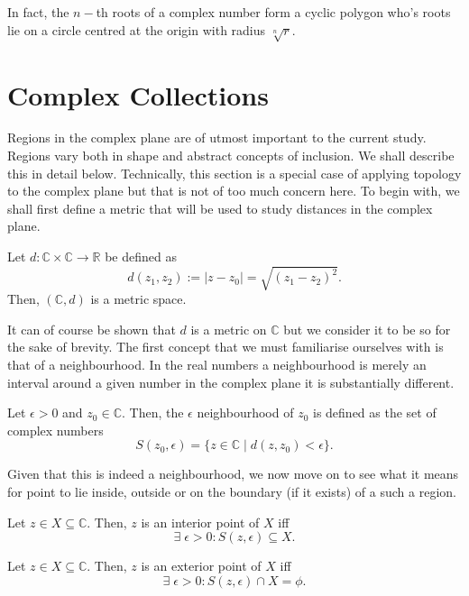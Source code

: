 \documentclass[12pt]{book}
\begin{document}
In fact, the $n-$th roots of a complex number form a cyclic polygon who's roots lie on a circle centred at the origin with radius $\sqrt[n]{r}.$

\section{Complex Collections}
Regions in the complex plane are of utmost important to the current study. Regions vary both in shape and abstract concepts of inclusion. We shall describe this in detail below. Technically, this section is a special case of applying topology to the complex plane but that is not of too much concern here. To begin with, we shall first define a metric that will be used to study distances in the complex plane.

\begin{defn}
    Let $d: \mathbb{C} \times \mathbb{C} \rightarrow \mathbb{R}$ be defined as
    \[
        d(z_1, z_2) := |z - z_{0}| = \sqrt{(z_1 - z_2)^2}.
    \]
    Then, $(\mathbb{C}, d)$ is a metric space.
\end{defn}
It can of course be shown that $d$ is a metric on $\mathbb{C}$ but we consider it to be so for the sake of brevity. The first concept that we must familiarise ourselves with is that of a neighbourhood. In the real numbers a neighbourhood is merely an interval around a given number in the complex plane it is substantially different. 

\begin{defn}
    Let $\epsilon > 0$ and $z_{0} \in \mathbb{C}.$ Then, the $\epsilon$ neighbourhood of $z_{0}$ is defined as the set of complex numbers 
    \[
        S(z_0, \epsilon) = \{z \in \mathbb{C}\; |\; d(z, z_0) < \epsilon\}.
    \]
\end{defn}

Given that this is indeed a neighbourhood, we now move on to see what it means for point to lie inside, outside or on the boundary (if it exists) of a such a region.

\begin{defn}
    Let $z \in X \subseteq \mathbb{C}.$ Then, $z$ is an interior point of $X$ iff
    \[
        \exists\; \epsilon > 0: S(z, \epsilon) \subseteq X.
    \]
\end{defn}

\begin{defn}
    Let $z \in X \subseteq \mathbb{C}.$ Then, $z$ is an exterior point of $X$ iff
    $$
        \exists\; \epsilon > 0: S(z, \epsilon) \cap X = \phi.
    $$
\end{defn}	
\end{document}
